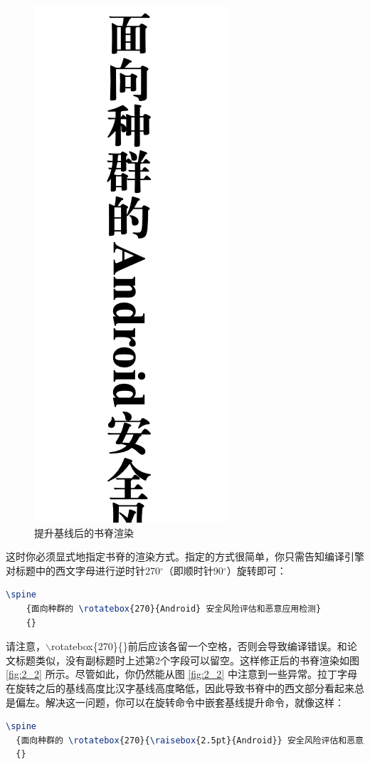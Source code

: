 \begin{figure}[!h]
\begin{minipage}[t]{0.3\textwidth}
    \centering
    \includegraphics[width=.3\linewidth]{figures/content/2_3}
    \caption{提升基线后的书脊渲染}
    \label{fig:2_3}
    \end{minipage}
\end{figure}

\noindent 这时你必须显式地指定书脊的渲染方式。指定的方式很简单，你只需告知编译引擎对标题中的西文字母进行逆时针270$^{\circ}$（即顺时针90$^{\circ}$）旋转即可：

\begin{tcolorbox}
\begin{lstlisting}[language=TeX]
\spine
    {面向种群的 \rotatebox{270}{Android} 安全风险评估和恶意应用检测}
    {}
\end{lstlisting}
\end{tcolorbox}

\noindent 请注意，{\codefont $\backslash$rotatebox\{270\}\{\}}前后应该各留一个空格，否则会导致编译错误。和论文标题类似，没有副标题时上述第2个字段可以留空。这样修正后的书脊渲染如图 \ref{fig:2_2} 所示。尽管如此，你仍然能从图 \ref{fig:2_2} 中注意到一些异常。拉丁字母在旋转之后的基线高度比汉字基线高度略低，因此导致书脊中的西文部分看起来总是偏左。解决这一问题，你可以在旋转命令中嵌套基线提升命令，就像这样：

\begin{tcolorbox}
\begin{lstlisting}[language=TeX]
\spine
  {面向种群的 \rotatebox{270}{\raisebox{2.5pt}{Android}} 安全风险评估和恶意应用检测}
  {}
\end{lstlisting}
\end{tcolorbox}

